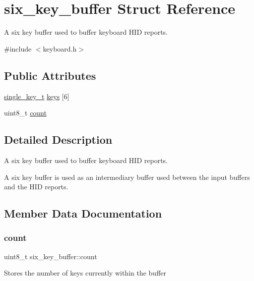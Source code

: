 \hypertarget{structsix__key__buffer}{}\section{six\+\_\+key\+\_\+buffer Struct Reference}
\label{structsix__key__buffer}


A six key buffer used to buffer keyboard H\+ID reports.  




{\ttfamily \#include $<$keyboard.\+h$>$}

\subsection*{Public Attributes}
\begin{DoxyCompactItemize}
\item 
\hyperlink{keyboard_8h_aa504c5d09bf7cea600b72b6003a8772c}{single\+\_\+key\+\_\+t} \hyperlink{structsix__key__buffer_a9377ae2bc38d395132633fb1f4790914}{keys} \mbox{[}6\mbox{]}
\item 
uint8\+\_\+t \hyperlink{structsix__key__buffer_a11703a2763f95be8e14f51bdac78c0eb}{count}
\end{DoxyCompactItemize}


\subsection{Detailed Description}
A six key buffer used to buffer keyboard H\+ID reports. 

A six key buffer is used as an intermediary buffer used between the input buffers and the H\+ID reports. 

\subsection{Member Data Documentation}
\mbox{\label{structsix__key__buffer_a11703a2763f95be8e14f51bdac78c0eb}} 
\subsubsection{\texorpdfstring{count}{count}}
{\footnotesize\ttfamily uint8\+\_\+t six\+\_\+key\+\_\+buffer\+::count}

Stores the number of keys currently within the buffer \mbox{\label{structsix__key__buffer_a9377ae2bc38d395132633fb1f4790914}} 
